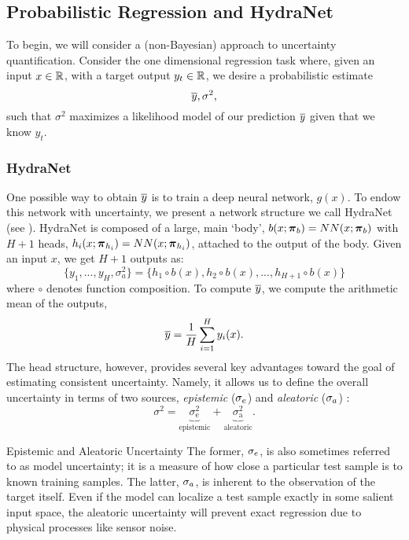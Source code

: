 \subsection{Probabilistic Regression and HydraNet}

To begin, we will consider a (non-Bayesian) approach to uncertainty quantification. Consider the one dimensional regression task where, given an input $x \in \mathbb{R}$, with a target output $y_t \in \mathbb{R}$, we desire a probabilistic estimate
\begin{equation}
\overline{y}, \sigma^2,
\end{equation}
such that $\sigma^2$ maximizes a likelihood model of our prediction $\overline{y}$ given that we know $y_t$.
\subsubsection{HydraNet}
One possible way to obtain $\overline{y}$ is to train a deep neural network, $g(x)$. To endow this network with uncertainty, we present a network structure we call HydraNet (see ). HydraNet is composed of a large, main `body', $b(x; \boldsymbol{\mathbf{\pi}}_b) = NN(x; \boldsymbol{\mathbf{\pi}}_b)$ with $H+1$ heads, $h_i(x; \boldsymbol{\mathbf{\pi}}_{h_i}) = NN(x; \boldsymbol{\mathbf{\pi}}_{h_i})$, attached to the output of the body. Given an input $x$, we get $H+1$ outputs as:
\begin{equation}
	\{y_1, ..., y_H, \sigma^2_a\} = \{h_1 \circ b (x), h_2 \circ b (x), ..., h_{H+1} \circ b (x)\}
\end{equation}
where $\circ$ denotes function composition. To compute  $\overline{y}$, we compute the arithmetic mean of the outputs,
\begin{equation}
\label{eq:hn_1d_mean}
\overline{y} = \frac{1}{H}\sum_{i=1}^{H}y_i(x).
\end{equation} 
The head structure, however, provides several key advantages toward the goal of estimating consistent uncertainty. Namely, it allows us to define the overall uncertainty in terms of two sources, \textit{epistemic} ($\sigma_e$) and \textit{aleatoric} ($\sigma_a$) \citep{Kendall2017-vs}:
\begin{equation}
\label{eq:1d_hydranet_uncertainty}
\sigma^2 = \underbrace{\sigma^2_{\text{e}}}_{\text{epistemic}} + \underbrace{\sigma^2_{\text{a}}}_{\text{aleatoric}}.
\end{equation} 
\begin{remark}{Epistemic and Aleatoric Uncertainty}
	The former, $\sigma_e$, is also sometimes referred to as model uncertainty; it is a measure of how close a particular test sample is to known training samples. The latter, $\sigma_a$, is inherent to the observation of the target itself.  Even if the model can localize a test sample exactly in some salient input space, the aleatoric uncertainty will prevent exact regression due to physical processes like sensor noise.
\end{remark}

